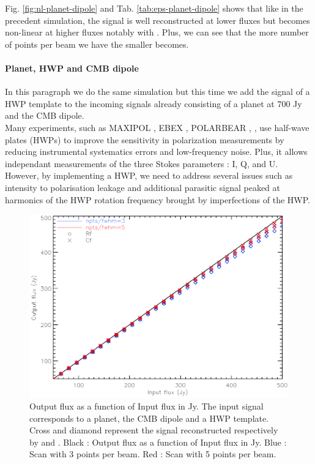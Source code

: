 Fig. \ref{fig:nl-planet-dipole} and Tab. \ref{tab:eps-planet-dipole} shows that like in the precedent simulation, the signal is well reconstructed at lower fluxes but becomes non-linear at higher fluxes notably with \rf. Plus, we can see that the more number of points per beam we have the smaller \eps becomes. 


\paragraph{Planet, HWP and CMB dipole \\}

In this paragraph we do the same simulation but this time we add the signal of a HWP template to the incoming signals already consisting of a planet at 700 Jy and the CMB dipole.\\
Many experiments, such as MAXIPOL \citep{2007ApJ...665...42J}, EBEX \citep{2010SPIE.7741E..1CR}, POLARBEAR \citep{2017JCAP...05..008T},  \citep{2017A&A...599A..34R}, use half-wave plates (HWPs) to improve the sensitivity in polarization measurements by reducing instrumental systematics errors and low-frequency noise. Plus, it allows independant measurements of the three Stokes parameters : I, Q, and U. However, by implementing a HWP, we need to address several issues such as intensity to polarisation leakage and additional parasitic signal peaked at harmonics of the HWP rotation frequency brought by imperfections of the HWP.

\begin{figure}[h]
\center
	\includegraphics[scale=0.5]{Figures/NL-planet-hwp-dipole.eps}
	\caption{Output flux as a function of Input flux in Jy. 
	The input signal corresponds to a planet, the CMB dipole and a HWP template. Cross and diamond represent the signal reconstructed respectively by \cf and \rf. Black : Output flux as a function of Input flux in Jy. Blue : Scan with 3 points per beam. Red : Scan with 5 points per beam.}
	\label{fig:nl-planet-hwp-dipole}
\end{figure}

